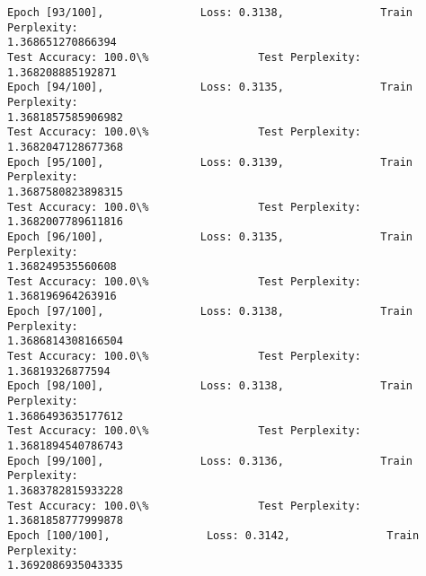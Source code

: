 \documentclass[11pt]{article}
\begin{document}
\begin{Verbatim}[commandchars=\\\{\}]
Epoch [93/100],               Loss: 0.3138,               Train Perplexity:
1.368651270866394
Test Accuracy: 100.0\%                 Test Perplexity: 1.368208885192871
Epoch [94/100],               Loss: 0.3135,               Train Perplexity:
1.3681857585906982
Test Accuracy: 100.0\%                 Test Perplexity: 1.3682047128677368
Epoch [95/100],               Loss: 0.3139,               Train Perplexity:
1.3687580823898315
Test Accuracy: 100.0\%                 Test Perplexity: 1.3682007789611816
Epoch [96/100],               Loss: 0.3135,               Train Perplexity:
1.368249535560608
Test Accuracy: 100.0\%                 Test Perplexity: 1.368196964263916
Epoch [97/100],               Loss: 0.3138,               Train Perplexity:
1.3686814308166504
Test Accuracy: 100.0\%                 Test Perplexity: 1.36819326877594
Epoch [98/100],               Loss: 0.3138,               Train Perplexity:
1.3686493635177612
Test Accuracy: 100.0\%                 Test Perplexity: 1.3681894540786743
Epoch [99/100],               Loss: 0.3136,               Train Perplexity:
1.3683782815933228
Test Accuracy: 100.0\%                 Test Perplexity: 1.3681858777999878
Epoch [100/100],               Loss: 0.3142,               Train Perplexity:
1.3692086935043335

    \end{Verbatim}


    
    
    
\end{document}
